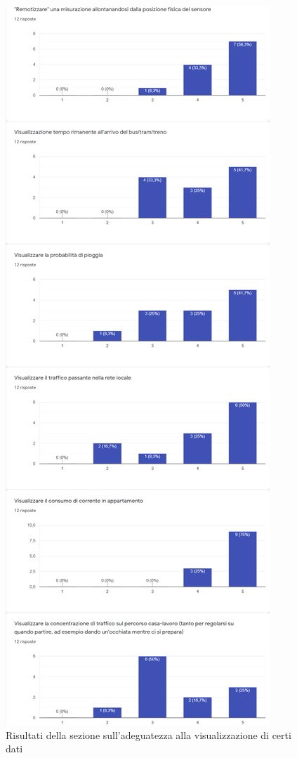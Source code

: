 \documentclass[12pt,a4paper]{report}
\begin{document}
\begin{figure}[h]
  \centering
  \includegraphics[width=\textwidth,height=0.95\textheight,keepaspectratio]{ressez2}
  \caption{Risultati della sezione sull'adeguatezza alla visualizzazione di certi dati}
  \label{fig:adeguatezzavis}
\end{figure}
\end{document}
